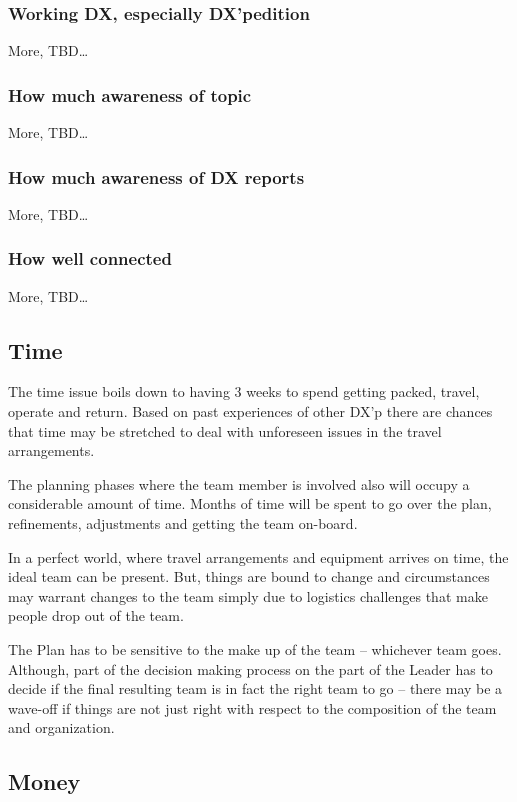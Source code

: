 \documentclass[11pt]{article}
\begin{document}
\subsubsection{Working DX, especially DX'pedition}
More, TBD\ldots
\subsubsection{How much awareness of topic}
More, TBD\ldots
\subsubsection{How much awareness of DX reports}
More, TBD\ldots
\subsubsection{How well connected}
More, TBD\ldots

\subsection{Time}
The time issue boils down to having 3 weeks
to spend getting packed, travel, operate and return.
Based on past experiences of other DX'p there are
chances that time may be stretched to deal with
unforeseen issues in the travel arrangements.
\par
The planning phases where the team member is involved
also will occupy a considerable amount of time.
Months of time will be spent to go over the plan,
refinements, adjustments and getting the team
on-board.
\par
In a perfect world, where travel arrangements
and equipment arrives on time, the ideal team
can be present.  But, things are bound to change
and circumstances may warrant changes to the team
simply due to logistics challenges that make people
drop out of the team.
\par
The Plan has to be sensitive to the make up of the
team -- whichever team goes.  Although, part of
the decision making process on the part of the Leader
has to decide if the final resulting team is in fact
the right team to go -- there may be a wave-off
if things are not just right with respect to the
composition of the team and organization.
\subsection{Money}
\end{document}
